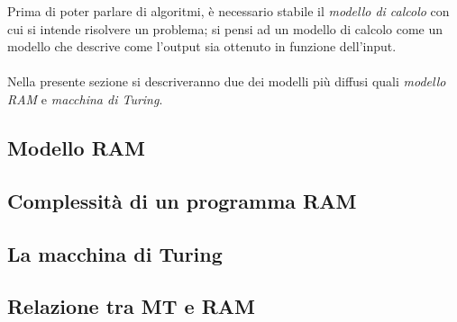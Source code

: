 \documentclass{subfiles}
\begin{document}
Prima di poter parlare di algoritmi, è necessario stabile il \emph{modello di calcolo} con cui si intende risolvere un problema;
si pensi ad un modello di calcolo come un modello che descrive come l'output sia ottenuto in funzione dell'input.
\\ \\
Nella presente sezione si descriveranno due dei modelli più diffusi quali \emph{modello RAM} e \emph{macchina di Turing}.

\subsection{Modello RAM}

\clearpage

\subsection{Complessità di un programma RAM}

\clearpage

\subsection{La macchina di Turing}

\clearpage

\subsection{Relazione tra MT e RAM}

\clearpage
\end{document}
